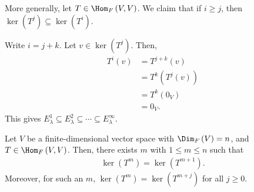 \documentclass[10pt]{mypackage}
\begin{document}
More generally, let $T\in \Hom_{F}\left(V,V\right)$. We claim that if $i\geq j$, then $\ker\left(T^j\right)\subseteq \ker\left(T^i\right)$.\newline

Write $i = j + k$. Let $v\in \ker\left(T^j\right)$. Then, 
\begin{align*}
  T^i\left(v\right) &= T^{j+k}\left(v\right)\\
                    &= T^{k}\left(T^j\left(v\right)\right)\\
                    &= T^{k}\left(0_V\right)\\
                    &= 0_V.
\end{align*}
This gives $E_{\lambda}^{1}\subseteq E_{\lambda}^{2}\subseteq \cdots\subseteq E_{\lambda}^{\infty}$.
\begin{lemma}
  Let $V$ be a finite-dimensional vector space with $\Dim_{F}\left(V\right) = n$, and $T\in \Hom_{F}\left(V,V\right)$. Then, there exists $m$ with $1 \leq m \leq n$ such that
  \begin{align*}
    \ker\left(T^{m}\right) = \ker\left(T^{m+1}\right).
  \end{align*}
  Moreover, for such an $m$, $\ker\left(T^{m}\right) = \ker\left(T^{m+j}\right)$ for all $j\geq 0$.
\end{lemma}
\end{document}
